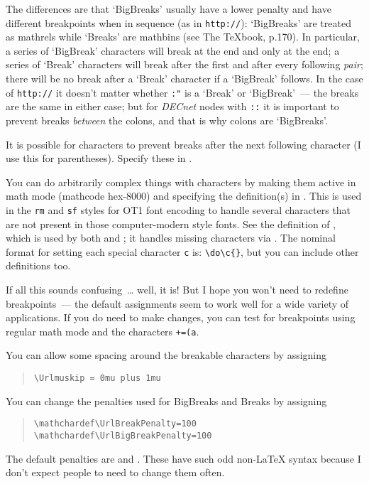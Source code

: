 \documentclass[a4paper]{article}
\begin{document}
The differences are that `BigBreaks' usually have a lower penalty and
have different breakpoints when in sequence (as in \texttt{http://}):
`BigBreaks' are treated as mathrels while `Breaks' are mathbins (see
The TeXbook, p.170). In particular, a series of `BigBreak' characters
will break at the end and only at the end; a series of `Break'
characters will break after the first and after every following
\emph{pair}; there will be no break after a `Break' character if a
`BigBreak' follows.  In the case of \texttt{http://} it doesn't matter
whether \texttt{:"} is a `Break' or `BigBreak'~--- the breaks are the
same in either case; but for \emph{DECnet} nodes with \texttt{::} it
is important to prevent breaks \emph{between} the colons, and that is
why colons are `BigBreaks'.

It is possible for characters to prevent breaks after the next
following character (I use this for parentheses).  Specify these in
.

You can do arbitrarily complex things with characters by making them
active in math mode (mathcode hex-8000) and specifying the
definition(s) in .  This is used in the \texttt{rm}
and \texttt{sf} styles for OT1 font encoding to handle several
characters that are not present in those computer-modern style fonts.
See the definition of , which is used by both
 and ; it handles missing characters
via .  The nominal format for setting each special
character \texttt{c} is: \verb+\do\c{+\verb+}+, but
you can include other definitions too.

If all this sounds confusing~\dots{} well, it is!  But I hope you
won't need to redefine breakpoints~--- the default assignments seem to
work well for a wide variety of applications.  If you do need to make
changes, you can test for breakpoints using regular math mode and the
characters \texttt{+=(a}. 

You can allow some spacing around the breakable characters by assigning
\begin{quote}
\begin{verbatim}
\Urlmuskip = 0mu plus 1mu
\end{verbatim}
\end{quote}
You can change the penalties used for BigBreaks and Breaks by assigning
\begin{quote}
\begin{verbatim}
\mathchardef\UrlBreakPenalty=100
\mathchardef\UrlBigBreakPenalty=100
\end{verbatim}
\end{quote}
The default penalties are  and .
These have such odd non-\LaTeX{} syntax because I don't expect people
to need to change them often.
\end{document}
